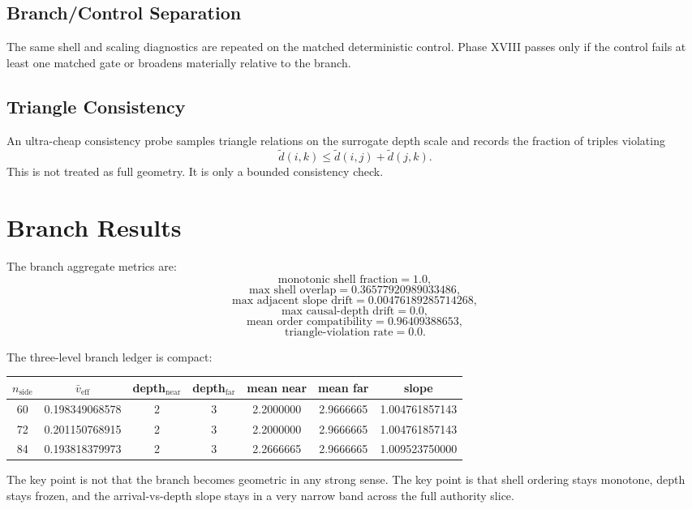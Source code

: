 \documentclass[11pt]{article}
\begin{document}
\subsection{Branch/Control Separation}

The same shell and scaling diagnostics are repeated on the matched deterministic control. Phase XVIII passes only if the control fails at least one matched gate or broadens materially relative to the branch.

\subsection{Triangle Consistency}

An ultra-cheap consistency probe samples triangle relations on the surrogate depth scale and records the fraction of triples violating
\[
\tilde d(i,k)\leq \tilde d(i,j)+\tilde d(j,k).
\]
This is not treated as full geometry. It is only a bounded consistency check.

\section{Branch Results}

The branch aggregate metrics are:
\[
\text{monotonic shell fraction}=1.0,
\]
\[
\text{max shell overlap}=0.36577920989033486,
\]
\[
\text{max adjacent slope drift}=0.00476189285714268,
\]
\[
\text{max causal-depth drift}=0.0,
\]
\[
\text{mean order compatibility}=0.96409388653,
\]
\[
\text{triangle-violation rate}=0.0.
\]

The three-level branch ledger is compact:
\begin{center}
\begin{tabular}{ccccccc}
\toprule
$n_{\mathrm{side}}$ & $\bar v_{\mathrm{eff}}$ & depth$_{\mathrm{near}}$ & depth$_{\mathrm{far}}$ & mean near & mean far & slope \\
\midrule
60 & 0.198349068578 & 2 & 3 & 2.2000000 & 2.9666665 & 1.004761857143 \\
72 & 0.201150768915 & 2 & 3 & 2.2000000 & 2.9666665 & 1.004761857143 \\
84 & 0.193818379973 & 2 & 3 & 2.2666665 & 2.9666665 & 1.009523750000 \\
\bottomrule
\end{tabular}
\end{center}

The key point is not that the branch becomes geometric in any strong sense. The key point is that shell ordering stays monotone, depth stays frozen, and the arrival-vs-depth slope stays in a very narrow band across the full authority slice.
\end{document}
